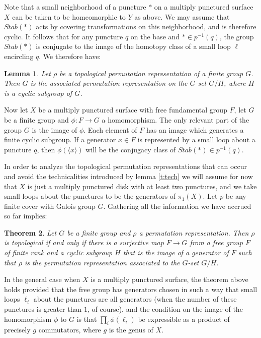 \documentclass[11pt]{amsart}
\newtheorem{thm}{Theorem}
\newtheorem{lemma}[thm]{Lemma}
\numberwithin{thm}{section}
\begin{document}
Note that a small neighborhood of a puncture $*$ on a multiply punctured surface $X$ can be taken to be homeomorphic to $Y$ as above.  We may assume that $Stab(*)$ acts by covering transformations on this neighborhood, and is therefore cyclic.  It follows that for any puncture $q$ on the base and $*\in p^{-1}(q)$, the group $Stab(*)$ is conjugate to the image of the homotopy class of a small loop $\ell$ encircling $q$.  We therefore have:

\begin{lemma}
Let $\rho$ be a topological permutation representation of a finite group $G$.  Then $G$ is the associated permutation representation on the $G$-set $G/H$, where $H$ is a cyclic subgroup of $G$.
\end{lemma}

Now let $X$ be a multiply punctured surface with free fundamental group $F$, let $G$ be a finite group and $\phi:F\to G$ a homomorphism.  The only relevant part of the group $G$ is the image of $\phi$.  Each element of $F$ has an image which generates a finite cyclic subgroup.  If a generator $x\in F$ is represented by a small loop about a puncture $q$, then $\phi(\langle x\rangle)$ will be the conjugacy class of $Stab(*)\in p^{-1}(q)$.

In order to analyze the topological permutation representations that can occur and avoid the technicalities introduced by lemma \ref{t:tech} we will assume for now that $X$ is just a multiply punctured disk with at least two punctures, and we take small loops about the punctures to be the generators of $\pi_1(X)$.  Let $p$ be any finite cover with Galois group $G$.  Gathering all the information we have accrued so far implies:

\begin{thm}
Let $G$ be a finite group and $\rho$ a permutation representation.  Then $\rho$ is topological if and only if there is a surjective map $F\to G$ from a free group $F$ of finite rank and a cyclic subgroup $H$ that is the image of a generator of $F$ such that $\rho$ is the permutation representation associated to the $G$-set $G/H$.
\end{thm}

In the general case when $X$ is a multiply punctured surface, the theorem above holds provided that the free group has generators chosen in such a way that small loops $\ell_i$ about the punctures are all generators (when the number of these punctures is greater than $1$, of course), and the condition on the image of the homomorphism $\phi$ to $G$ is that $\prod_i \phi(\ell_i)$ be expressible as a product of precisely $g$ commutators, where $g$ is the genus of $X$.
\end{document}

